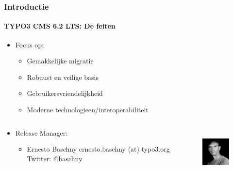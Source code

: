 \begin{frame}[fragile]
	\frametitle{Introductie}
	\framesubtitle{TYPO3 CMS 6.2 LTS: De feiten}

	\begin{itemize}
		\item Focus op:
			\begin{itemize}
				\item Gemakkelijke migratie
				\item Robuust en veilige basis 
				\item Gebruikersvriendelijkheid 
				\item Moderne technologieen/interoperabiliteit
			\end{itemize}
	\end{itemize}

	\begin{columns}[T]
		\begin{column}{.5\textwidth}
			\begin{itemize}
				\item Release Manager:
				\begin{itemize}
					\item Ernesto Baschny\newline
						ernesto.baschny (at) typo3.org\newline
						Twitter: @baschny
				\end{itemize}
			\end{itemize}
		\end{column}

		\begin{column}{.5\textwidth}
			\begin{figure}
				\includegraphics[width=2.6cm,height=2.6cm]{Images/Introduction/ErnestoBaschny.jpg}
			\end{figure}
		\end{column}

	\end{columns}

\end{frame}


